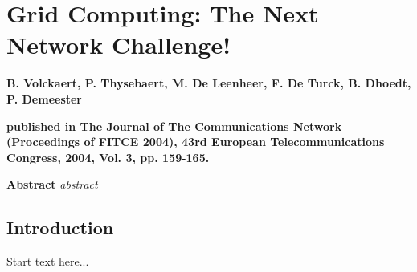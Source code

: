 \graphicspath{{chapt_dutch/}{intro/}{chapt2/}{chapt3/}{chapt4/}{chapt5/}}

\renewcommand\evenpagerightmark{{\scshape\small Appendix A}}
\renewcommand\oddpageleftmark{{\scshape\small Grid Computing: The Next Network Challenge!}}

\renewcommand{\bibname}{References}

\hyphenation{}

\chapter[Grid Computing: The Next Network Challenge!]%
 {Grid Computing: The Next Network Challenge!}
\label{app1}

\par{\large{\textbf{B. Volckaert, P. Thysebaert, M. De Leenheer, F. De Turck, B. Dhoedt, P. Demeester}}}
\vspace{0.2in}
\par{\noindent\textbf{published in The Journal of The Communications Network (Proceedings of FITCE 2004), 43rd European Telecommunications Congress, 2004, Vol. 3, pp. 159-165.}}
\vspace{0.1in}

\par{\bf{Abstract}}
\emph{
  abstract
}

\section{Introduction}
Start text here...

\lipsum




\clearpage{\pagestyle{empty}\cleardoublepage}
